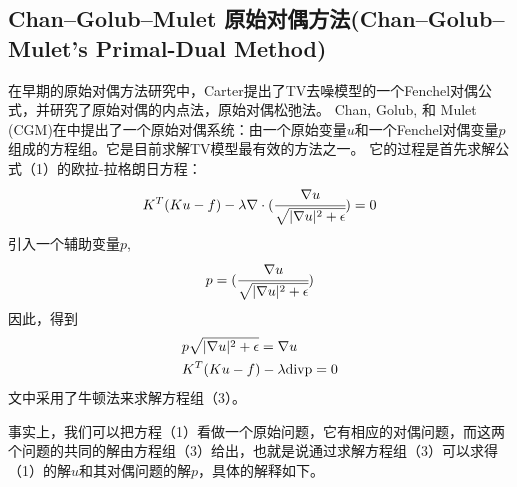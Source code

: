 \documentclass[a4paper,12pt]{article}
\begin{document}
%
%
%

\subsection{Chan–Golub–Mulet 原始对偶方法(Chan–Golub–Mulet's Primal-Dual Method)}
在早期的原始对偶方法研究中，Carter\cite{Carter:2001du}提出了TV去噪模型的一个Fenchel对偶公式，并研究了原始对偶的内点法，原始对偶松弛法。 Chan, Golub, 和 Mulet (CGM)在\cite{Chan:1999cg}中提出了一个原始对偶系统：由一个原始变量$u$和一个Fenchel对偶变量$p$组成的方程组。它是目前求解TV模型最有效的方法之一。
它的过程是首先求解公式（1）的欧拉-拉格朗日方程：
\begin{displaymath}
K^T(Ku-f)-\lambda\nabla\cdot(\cfrac{\nabla u}{\sqrt{|\nabla u|^2+\epsilon}})=0
\end{displaymath}
引入一个辅助变量$p$,
\begin{displaymath}
p=(\cfrac{\nabla u}{\sqrt{|\nabla u|^2+\epsilon}})
\end{displaymath}
因此，得到
\begin{equation}
\begin{split}
&p\sqrt{|\nabla u|^2+\epsilon}=\nabla u\\
&K^T(Ku-f)-\lambda \rm div p=0
\end{split}
\end{equation}
文中采用了牛顿法来求解方程组（3）。

事实上，我们可以把方程（1）看做一个原始问题，它有相应的对偶问题，而这两个问题的共同的解由方程组（3）给出，也就是说通过求解方程组（3）可以求得（1）的解$u$和其对偶问题的解$p$，具体的解释如下。
\end{document}

